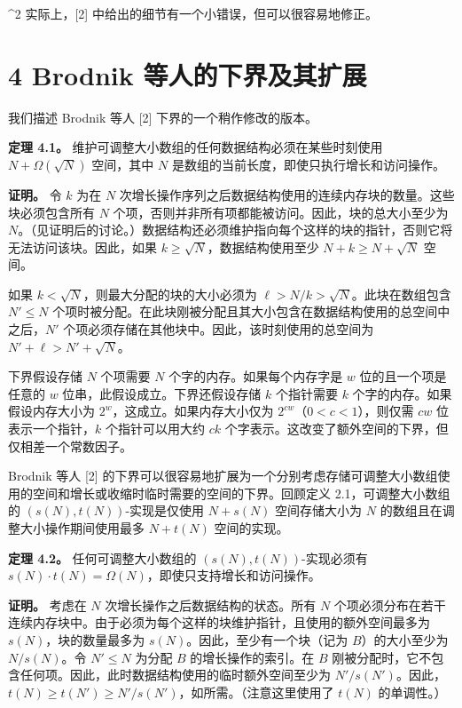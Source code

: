 \documentclass[12pt,a4paper]{ctexart}
\theoremstyle{remark}
\begin{document}
^2 实际上，[2] 中给出的细节有一个小错误，但可以很容易地修正。

\section{4 Brodnik 等人的下界及其扩展}

我们描述 Brodnik 等人 [2] 下界的一个稍作修改的版本。

\textbf{定理 4.1。} 维护可调整大小数组的任何数据结构必须在某些时刻使用 $N+\Omega(\sqrt{N})$ 空间，其中 $N$ 是数组的当前长度，即使只执行增长和访问操作。

\textbf{证明。} 令 $k$ 为在 $N$ 次增长操作序列之后数据结构使用的连续内存块的数量。这些块必须包含所有 $N$ 个项，否则并非所有项都能被访问。因此，块的总大小至少为 $N$。（见证明后的讨论。）数据结构还必须维护指向每个这样的块的指针，否则它将无法访问该块。因此，如果 $k\geq\sqrt{N}$，数据结构使用至少 $N+k\geq N+\sqrt{N}$ 空间。

如果 $k<\sqrt{N}$，则最大分配的块的大小必须为 $\ell>N/k>\sqrt{N}$。此块在数组包含 $N'\leq N$ 个项时被分配。在此块刚被分配且其大小包含在数据结构使用的总空间中之后，$N'$ 个项必须存储在其他块中。因此，该时刻使用的总空间为 $N'+\ell>N'+\sqrt{N}$。

下界假设存储 $N$ 个项需要 $N$ 个字的内存。如果每个内存字是 $w$ 位的且一个项是任意的 $w$ 位串，此假设成立。下界还假设存储 $k$ 个指针需要 $k$ 个字的内存。如果假设内存大小为 $2^w$，这成立。如果内存大小仅为 $2^{cw}$（$0<c<1$），则仅需 $cw$ 位表示一个指针，$k$ 个指针可以用大约 $ck$ 个字表示。这改变了额外空间的下界，但仅相差一个常数因子。

Brodnik 等人 [2] 的下界可以很容易地扩展为一个分别考虑存储可调整大小数组使用的空间和增长或收缩时临时需要的空间的下界。回顾定义 2.1，可调整大小数组的 $(s(N),t(N))$-实现是仅使用 $N+s(N)$ 空间存储大小为 $N$ 的数组且在调整大小操作期间使用最多 $N+t(N)$ 空间的实现。

\textbf{定理 4.2。} 任何可调整大小数组的 $(s(N),t(N))$-实现必须有 $s(N)\cdot t(N)=\Omega(N)$，即使只支持增长和访问操作。

\textbf{证明。} 考虑在 $N$ 次增长操作之后数据结构的状态。所有 $N$ 个项必须分布在若干连续内存块中。由于必须为每个这样的块维护指针，且使用的额外空间最多为 $s(N)$，块的数量最多为 $s(N)$。因此，至少有一个块（记为 $B$）的大小至少为 $N/s(N)$。令 $N'\leq N$ 为分配 $B$ 的增长操作的索引。在 $B$ 刚被分配时，它不包含任何项。因此，此时数据结构使用的临时额外空间至少为 $N'/s(N')$。因此，$t(N)\geq t(N')\geq N'/s(N')$，如所需。（注意这里使用了 $t(N)$ 的单调性。）
\end{document}
